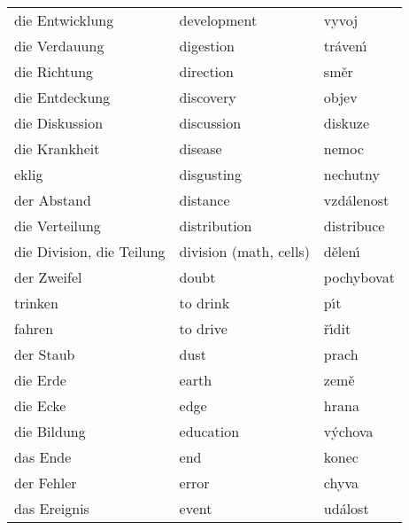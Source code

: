 \documentclass[11pt]{article}
\begin{document}
\begin{longtable}{lll}
 die Entwicklung                  &  development              &  vyvoj               \\
 die Verdauung                    &  digestion                &  tr\'aven\'\i        \\
 die Richtung                     &  direction                &  sm\v er             \\
 die Entdeckung                   &  discovery                &  objev               \\
 die Diskussion                   &  discussion               &  diskuze             \\
 die Krankheit                    &  disease                  &  nemoc               \\
 eklig                            &  disgusting               &  nechutny            \\
 der Abstand                      &  distance                 &  vzd\'alenost        \\
 die Verteilung                   &  distribution             &  distribuce          \\
 die Division, die Teilung        &  division (math, cells)   &  d\v elen\'\i        \\
 der Zweifel                      &  doubt                    &  pochybovat          \\
 trinken                          &  to drink                 &  p\'\i t             \\
 fahren                           &  to drive                 &  \v r\'\i dit        \\
 der Staub                        &  dust                     &  prach               \\
 die Erde                         &  earth                    &  zem\v e             \\
 die Ecke                         &  edge                     &  hrana               \\
 die Bildung                      &  education                &  v\'ychova           \\
 das Ende                         &  end                      &  konec               \\
 der Fehler                       &  error                    &  chyva               \\
 das Ereignis                     &  event                    &  ud\'alost           \\
\end{longtable}
\end{document}
